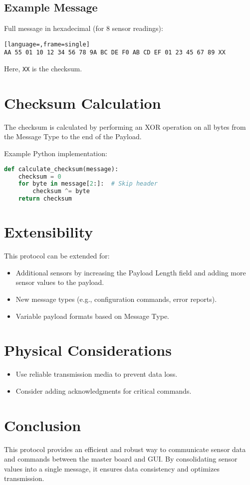 \documentclass{article}
\begin{document}
\subsection{Example Message}
Full message in hexadecimal (for 8 sensor readings):
\begin{lstlisting}[language=,frame=single]
AA 55 01 10 12 34 56 78 9A BC DE F0 AB CD EF 01 23 45 67 89 XX
\end{lstlisting}
Here, \texttt{XX} is the checksum.

\section{Checksum Calculation}
The checksum is calculated by performing an XOR operation on all bytes from the Message Type to the end of the Payload.

Example Python implementation:
\begin{lstlisting}[language=Python]
def calculate_checksum(message):
    checksum = 0
    for byte in message[2:]:  # Skip header
        checksum ^= byte
    return checksum
\end{lstlisting}

\section{Extensibility}
This protocol can be extended for:
\begin{itemize}
    \item Additional sensors by increasing the Payload Length field and adding more sensor values to the payload.
    \item New message types (e.g., configuration commands, error reports).
    \item Variable payload formats based on Message Type.
\end{itemize}

\section{Physical Considerations}
\begin{itemize}
    \item Use reliable transmission media to prevent data loss.
    \item Consider adding acknowledgments for critical commands.
\end{itemize}

\section{Conclusion}
This protocol provides an efficient and robust way to communicate sensor data and commands between the master board and GUI. By consolidating sensor values into a single message, it ensures data consistency and optimizes transmission.
\end{document}

